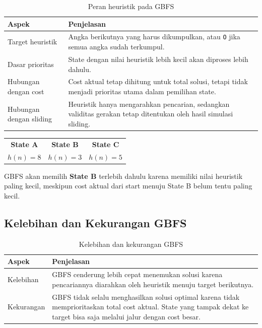 \begin{table}[H]
	\centering
	\caption{Peran heuristik pada GBFS}
	\begin{tabular}{|p{4cm}|p{10cm}|}
		\hline
		\rowcolor{orange!20}
		\textbf{Aspek} & \textbf{Penjelasan} \\
		\hline
		Target heuristik & Angka berikutnya yang harus dikumpulkan, atau \texttt{O} jika semua angka sudah terkumpul. \\
		\hline
		Dasar prioritas & State dengan nilai heuristik lebih kecil akan diproses lebih dahulu. \\
		\hline
		Hubungan dengan cost & Cost aktual tetap dihitung untuk total solusi, tetapi tidak menjadi prioritas utama dalam pemilihan state. \\
		\hline
		Hubungan dengan sliding & Heuristik hanya mengarahkan pencarian, sedangkan validitas gerakan tetap ditentukan oleh hasil simulasi sliding. \\
		\hline
	\end{tabular}
\end{table}

\begin{tcolorbox}[
	colback=orange!5,
	colframe=orange!70!black,
	title=\textbf{Ilustrasi Keputusan GBFS},
	arc=2mm,
	boxrule=0.8pt
]
\begin{center}
\begin{tabular}{c c c}
\textbf{State A} & \textbf{State B} & \textbf{State C} \\
$h(n)=8$ & $h(n)=3$ & $h(n)=5$ \\
\end{tabular}
\end{center}

GBFS akan memilih \textbf{State B} terlebih dahulu karena memiliki nilai heuristik paling kecil, meskipun cost aktual dari start menuju State B belum tentu paling kecil.
\end{tcolorbox}

\subsection{Kelebihan dan Kekurangan GBFS}

\begin{table}[H]
	\centering
	\caption{Kelebihan dan kekurangan GBFS}
	\begin{tabular}{|p{3cm}|p{11cm}|}
		\hline
		\rowcolor{orange!20}
		\textbf{Aspek} & \textbf{Penjelasan} \\
		\hline
		Kelebihan & GBFS cenderung lebih cepat menemukan solusi karena pencariannya diarahkan oleh heuristik menuju target berikutnya. \\
		\hline
		Kekurangan & GBFS tidak selalu menghasilkan solusi optimal karena tidak memprioritaskan total cost aktual. State yang tampak dekat ke target bisa saja melalui jalur dengan cost besar. \\
		\hline
	\end{tabular}
\end{table}

